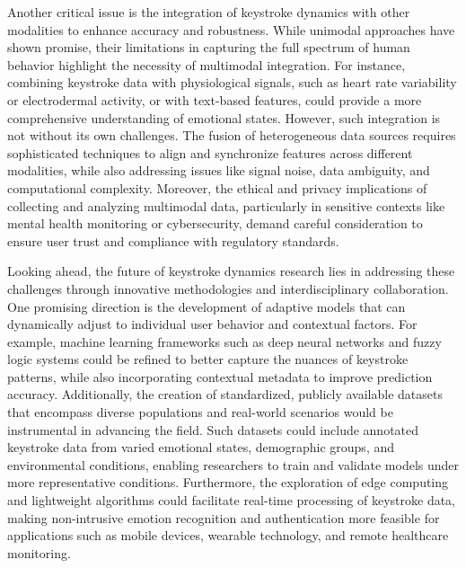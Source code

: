 \documentclass[conference]{IEEEtran}
\begin{document}
Another critical issue is the integration of keystroke dynamics with other modalities to enhance accuracy and robustness. While unimodal approaches have shown promise, their limitations in capturing the full spectrum of human behavior highlight the necessity of multimodal integration. For instance, combining keystroke data with physiological signals, such as heart rate variability or electrodermal activity, or with text-based features, could provide a more comprehensive understanding of emotional states. However, such integration is not without its own challenges. The fusion of heterogeneous data sources requires sophisticated techniques to align and synchronize features across different modalities, while also addressing issues like signal noise, data ambiguity, and computational complexity. Moreover, the ethical and privacy implications of collecting and analyzing multimodal data, particularly in sensitive contexts like mental health monitoring or cybersecurity, demand careful consideration to ensure user trust and compliance with regulatory standards.

Looking ahead, the future of keystroke dynamics research lies in addressing these challenges through innovative methodologies and interdisciplinary collaboration. One promising direction is the development of adaptive models that can dynamically adjust to individual user behavior and contextual factors. For example, machine learning frameworks such as deep neural networks and fuzzy logic systems could be refined to better capture the nuances of keystroke patterns, while also incorporating contextual metadata to improve prediction accuracy. Additionally, the creation of standardized, publicly available datasets that encompass diverse populations and real-world scenarios would be instrumental in advancing the field. Such datasets could include annotated keystroke data from varied emotional states, demographic groups, and environmental conditions, enabling researchers to train and validate models under more representative conditions. Furthermore, the exploration of edge computing and lightweight algorithms could facilitate real-time processing of keystroke data, making non-intrusive emotion recognition and authentication more feasible for applications such as mobile devices, wearable technology, and remote healthcare monitoring.
\end{document}
